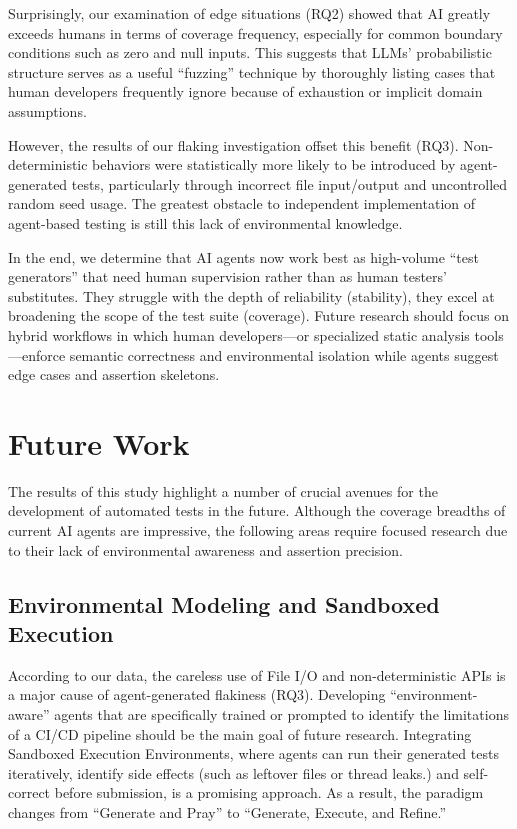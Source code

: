 \documentclass[conference]{IEEEtran}
\begin{document}
Surprisingly, our examination of edge situations (RQ2) showed that AI greatly exceeds humans in terms of coverage frequency, especially for common boundary conditions such as zero and null inputs. This suggests that LLMs' probabilistic structure serves as a useful ``fuzzing'' technique by thoroughly listing cases that human developers frequently ignore because of exhaustion or implicit domain assumptions.

However, the results of our flaking investigation offset this benefit (RQ3). Non-deterministic behaviors were statistically more likely to be introduced by agent-generated tests, particularly through incorrect file input/output and uncontrolled random seed usage. The greatest obstacle to independent implementation of agent-based testing is still this lack of environmental knowledge.

In the end, we determine that AI agents now work best as high-volume ``test generators'' that need human supervision rather than as human testers' substitutes. They struggle with the depth of reliability (stability), they excel at broadening the scope of the test suite (coverage). Future research should focus on hybrid workflows in which human developers—or specialized static analysis tools—enforce semantic correctness and environmental isolation while agents suggest edge cases and assertion skeletons.

\section{Future Work}
\label{Section:FutureWork}
The results of this study highlight a number of crucial avenues for the development of automated tests in the future. Although the coverage breadths of current AI agents are impressive, the following areas require focused research due to their lack of environmental awareness and assertion precision.

\subsection{Environmental Modeling and Sandboxed Execution}
According to our data, the careless use of File I/O and non-deterministic APIs is a major cause of agent-generated flakiness (RQ3). Developing ``environment-aware'' agents that are specifically trained or prompted to identify the limitations of a CI/CD pipeline should be the main goal of future research. Integrating Sandboxed Execution Environments, where agents can run their generated tests iteratively, identify side effects (such as leftover files or thread leaks.) and self-correct before submission, is a promising approach. As a result, the paradigm changes from ``Generate and Pray'' to ``Generate, Execute, and Refine.''
\end{document}
